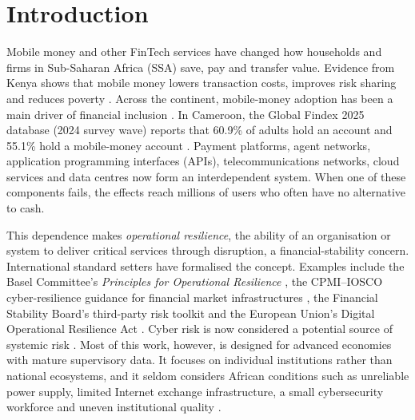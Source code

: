 \documentclass[fintech,article,submit,pdftex,moreauthors]{Definitions/mdpi}
\begin{document}
\section{Introduction}

Mobile money and other FinTech services have changed how households and firms in Sub-Saharan Africa (SSA) save, pay and transfer value. Evidence from Kenya shows that mobile money lowers transaction costs, improves risk sharing and reduces poverty \citep{Jack2014,Suri2016}. Across the continent, mobile-money adoption has been a main driver of financial inclusion \citep{Ahmad2020,Lashitew2019}. In Cameroon, the Global Findex 2025 database (2024 survey wave) reports that 60.9\% of adults hold an account and 55.1\% hold a mobile-money account \citep{WB2025Findex}. Payment platforms, agent networks, application programming interfaces (APIs), telecommunications networks, cloud services and data centres now form an interdependent system. When one of these components fails, the effects reach millions of users who often have no alternative to cash.

This dependence makes \emph{operational resilience}, the ability of an organisation or system to deliver critical services through disruption, a financial-stability concern. International standard setters have formalised the concept. Examples include the Basel Committee's \emph{Principles for Operational Resilience} \citep{BCBS2021}, the CPMI--IOSCO cyber-resilience guidance for financial market infrastructures \citep{CPMI2016}, the Financial Stability Board's third-party risk toolkit \citep{FSB2023} and the European Union's Digital Operational Resilience Act \citep[DORA;][]{EU2022DORA}. Cyber risk is now considered a potential source of systemic risk \citep{Kopp2017,Bouveret2018,Aldasoro2022}. Most of this work, however, is designed for advanced economies with mature supervisory data. It focuses on individual institutions rather than national ecosystems, and it seldom considers African conditions such as unreliable power supply, limited Internet exchange infrastructure, a small cybersecurity workforce and uneven institutional quality \citep{Kshetri2019}.
\end{document}
